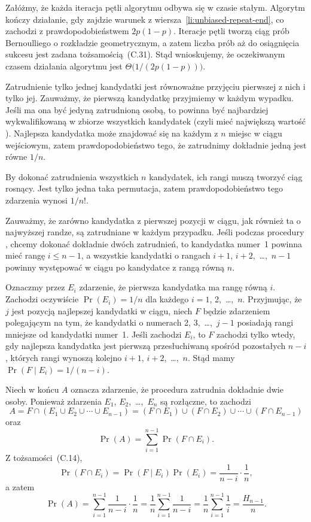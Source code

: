 Załóżmy, że każda iteracja pętli algorytmu odbywa się w czasie stałym. Algorytm kończy działanie, gdy zajdzie warunek z wiersza~\ref{li:unbiased-repeat-end}, co zachodzi z prawdopodobieństwem $2p(1-p)$. Iteracje pętli tworzą ciąg prób Bernoulliego o rozkładzie geometrycznym, a zatem liczba prób aż do osiągnięcia sukcesu jest zadana tożsamością~(C.31). Stąd wnioskujemy, że oczekiwanym czasem działania algorytmu jest $\Theta\bigl(1/(2p(1-p))\bigr)$.


\exercise{} %
Zatrudnienie tylko jednej kandydatki jest równoważne przyjęciu pierwszej z nich i tylko jej. Zauważmy, że pierwszą kandydatkę przyjmiemy w każdym wypadku. Jeśli ma ona być jedyną zatrudnioną osobą, to powinna być najbardziej wykwalifikowaną w zbiorze wszystkich kandydatek (czyli mieć największą wartość ). Najlepsza kandydatka może znajdować się na każdym z $n$ miejsc w ciągu wejściowym, zatem prawdopodobieństwo tego, że zatrudnimy dokładnie jedną jest równe $1/n$.

By dokonać zatrudnienia wszystkich $n$ kandydatek, ich rangi muszą tworzyć ciąg rosnący. Jest tylko jedna taka permutacja, zatem prawdopodobieństwo tego zdarzenia wynosi $1/n!$.

\exercise{} %
Zauważmy, że zarówno kandydatka z pierwszej pozycji w ciągu, jak również ta o najwyższej randze, są zatrudniane w każdym przypadku. Jeśli podczas procedury , chcemy dokonać dokładnie dwóch zatrudnień, to kandydatka numer~1 powinna mieć rangę $i\le n-1$, a wszystkie kandydatki o rangach $i+1$, $i+2$,~\dots,~$n-1$ powinny występować w ciągu po kandydatce z rangą równą $n$.

Oznaczmy przez $E_i$ zdarzenie, że pierwsza kandydatka ma rangę równą $i$. Zachodzi oczywiście $\Pr(E_i)=1/n$ dla każdego $i=1$, 2,~\dots,~$n$. Przyjmując, że $j$ jest pozycją najlepszej kandydatki w ciągu, niech $F$ będzie zdarzeniem polegającym na tym, że kandydatki o numerach 2, 3,~\dots,~$j-1$ posiadają rangi mniejsze od kandydatki numer~1. Jeśli zachodzi $E_i$, to $F$ zachodzi tylko wtedy, gdy najlepsza kandydatka jest pierwszą przesłuchiwaną spośród pozostałych $n-i$, których rangi wynoszą kolejno $i+1$, $i+2$,~\dots,~$n$. Stąd mamy $\Pr(F\mid E_i)=1/(n-i)$.

Niech w końcu $A$ oznacza zdarzenie, że procedura  zatrudnia dokładnie dwie osoby. Ponieważ zdarzenia $E_1$, $E_2$,~\dots,~$E_n$ są rozłączne, to zachodzi
\[
	A = F\cap(E_1\cup E_2\cup\cdots\cup E_{n-1}) = (F\cap E_1)\cup(F\cap E_2)\cup\cdots\cup(F\cap E_{n-1})
\]
oraz
\[
	\Pr(A) = \sum_{i=1}^{n-1}\Pr(F\cap E_i).
\]
Z tożsamości~(C.14),
\[
	\Pr(F\cap E_i) = \Pr(F\mid E_i)\Pr(E_i) = \frac{1}{n-i}\cdot\frac{1}{n},
\]
a zatem
\[
	\Pr(A) = \sum_{i=1}^{n-1}\frac{1}{n-i}\cdot\frac{1}{n} = \frac{1}{n}\sum_{i=1}^{n-1}\frac{1}{n-i} = \frac{1}{n}\sum_{i=1}^{n-1}\frac{1}{i} = \frac{H_{n-1}}{n}.
\]

